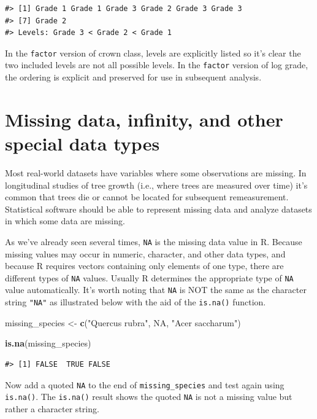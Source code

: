 \documentclass[
  11pt,
]{krantz}
\newenvironment{Shaded}{\begin{snugshade}}{\end{snugshade}}
\newcommand{\KeywordTok}[1]{\textcolor[rgb]{0.13,0.29,0.53}{\textbf{#1}}}
\newcommand{\NormalTok}[1]{#1}
\newcommand{\OtherTok}[1]{\textcolor[rgb]{0.56,0.35,0.01}{#1}}
\newcommand{\StringTok}[1]{\textcolor[rgb]{0.31,0.60,0.02}{#1}}
\theoremstyle{definition}
\theoremstyle{definition}
\theoremstyle{definition}
\theoremstyle{definition}
\theoremstyle{remark}
\begin{document}
\begin{verbatim}
#> [1] Grade 1 Grade 1 Grade 3 Grade 2 Grade 3 Grade 3
#> [7] Grade 2
#> Levels: Grade 3 < Grade 2 < Grade 1
\end{verbatim}

In the \texttt{factor} version of crown class, levels are explicitly listed so it's clear the two included levels are not all possible levels. In the \texttt{factor} version of log grade, the ordering is explicit and preserved for use in subsequent analysis.

\hypertarget{specialDataTypes}{%
\section{Missing data, infinity, and other special data types}\label{specialDataTypes}}

Most real-world datasets have variables where some observations are missing. In longitudinal studies of tree growth (i.e., where trees are measured over time) it's common that trees die or cannot be located for subsequent remeasurement. Statistical software should be able to represent missing data and analyze datasets in which some data are missing.

As we've already seen several times, \texttt{NA} is the missing data value in R. Because missing values may occur in numeric, character, and other data types, and because R requires vectors containing only elements of one type, there are different types of \texttt{NA} values. Usually R determines the appropriate type of \texttt{NA} value automatically. It's worth noting that \texttt{NA} is NOT the same as the character string \texttt{"NA"} as illustrated below with the aid of the \texttt{is.na()} function.

\begin{Shaded}
\begin{Highlighting}[]
\NormalTok{missing\_species \textless{}{-}}\StringTok{ }\KeywordTok{c}\NormalTok{(}\StringTok{"Quercus rubra"}\NormalTok{, }\OtherTok{NA}\NormalTok{, }\StringTok{"Acer saccharum"}\NormalTok{)}

\KeywordTok{is.na}\NormalTok{(missing\_species)}
\end{Highlighting}
\end{Shaded}

\begin{verbatim}
#> [1] FALSE  TRUE FALSE
\end{verbatim}

Now add a quoted \texttt{NA} to the end of \texttt{missing\_species} and test again using \texttt{is.na()}. The \texttt{is.na()} result shows the quoted \texttt{NA} is not a missing value but rather a character string.
\end{document}
